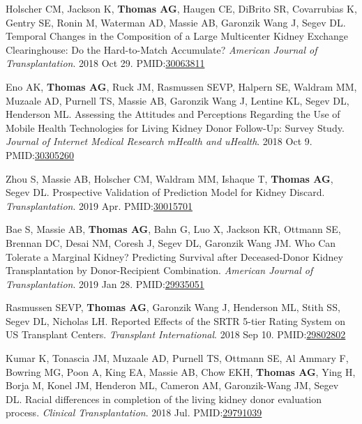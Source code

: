 \documentclass[10pt]{article}
\makeatletter
\newlength{\bibhang}
\newlength{\bibsep}
 {\@listi \global\bibsep\itemsep \global\advance\bibsep by\parsep}
\newenvironment{bibenum*}
  {\renewcommand\labelenumi{[\theenumi]}%
   \etaremune[
     topsep=0pt,
     itemsep=\bibsep,
     parsep=0pt,partopsep=0pt,
     itemindent=-\bibhang,
     leftmargin={\bibhang+\widthof{[999]}}]}
  {\endetaremune}
\newcommand{\pmid}[1]{PMID:\href{https://www.ncbi.nlm.nih.gov/pubmed/#1}{#1}}
\makeatother
\begin{document}
\begin{bibenum*}
\item Holscher CM, Jackson K, \textbf{Thomas AG}, Haugen CE, DiBrito SR,
  Covarrubias K, Gentry SE, Ronin M, Waterman AD, Massie AB,
  Garonzik Wang J, Segev DL.
  Temporal Changes in the Composition of a Large Multicenter Kidney
  Exchange Clearinghouse: Do the Hard-to-Match Accumulate?
  \emph{American Journal of Transplantation}. 2018 Oct 29.
  \pmid{30063811} 

\item Eno AK, \textbf{Thomas AG}, Ruck JM, Rasmussen SEVP,
  Halpern SE, Waldram MM, Muzaale AD, Purnell TS, Massie AB,
  Garonzik Wang J, Lentine KL, Segev DL, Henderson ML.
  Assessing the Attitudes and Perceptions Regarding the Use of Mobile Health Technologies for Living Kidney Donor Follow-Up: Survey Study.
  \emph{Journal of Internet Medical Research mHealth and uHealth}.
  2018 Oct 9.
  \pmid{30305260} 

\item Zhou S, Massie AB, Holscher CM, Waldram MM, Ishaque T,
  \textbf{Thomas AG}, Segev DL. Prospective Validation of Prediction
  Model for Kidney Discard.
  \emph{Transplantation}. 2019 Apr.
  \pmid{30015701} 

\item Bae S, Massie AB, \textbf{Thomas AG}, Bahn G, Luo X, Jackson KR,
  Ottmann SE, Brennan DC, Desai NM, Coresh J, Segev DL, Garonzik Wang JM.
  Who Can Tolerate a Marginal Kidney? Predicting Survival after
  Deceased-Donor Kidney Transplantation by Donor-Recipient Combination.
  \emph{American Journal of Transplantation}. 2019 Jan 28.
  \pmid{29935051} 

\item Rasmussen SEVP, \textbf{Thomas AG}, Garonzik Wang J,
  Henderson ML, Stith SS, Segev DL, Nicholas LH. Reported Effects
  of the SRTR 5-tier Rating System on US Transplant Centers.
  \emph{Transplant International}. 2018 Sep 10.
  \pmid{29802802} 

\item Kumar K, Tonascia JM, Muzaale AD, Purnell TS, Ottmann SE,
  Al Ammary F, Bowring MG, Poon A, King EA, Massie AB, Chow EKH,
  \textbf{Thomas AG}, Ying H, Borja M, Konel JM, Henderon ML,
  Cameron AM, Garonzik-Wang JM, Segev DL. Racial differences in
  completion of the living kidney donor evaluation process.
  \emph{Clinical Transplantation}. 2018 Jul.
  \pmid{29791039} 


\end{bibenum*}
\end{document}
